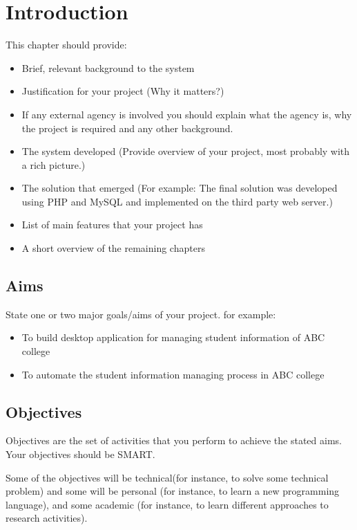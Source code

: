 \chapter{Introduction} %
\label{cha:introduction}

This chapter should provide:
\begin{itemize}
  \item Brief, relevant background to the system

  \item Justification for your project (Why it matters?)

  \item If any external agency is involved you should explain what the agency is, why the project is required and any other background.

  \item The system developed (Provide overview of your project, most probably with a rich picture.)
  \item The solution that emerged (For example: The final solution was developed using PHP and MySQL and implemented on the third party web server.)
  \item List of main features that your project has
  \item A short overview of the remaining chapters
\end{itemize}

\section{Aims} %
\label{sec:aims}
State one or two major goals/aims of your project.
for example:\\
\begin{itemize}
  \item To build desktop application for managing student information of ABC college
  \item To automate the student information managing process in ABC college
\end{itemize}

\section{Objectives} %
\label{sec:objectives}

Objectives are the set of activities that you perform to achieve the stated aims. Your objectives should be SMART.

Some of the objectives will be technical(for instance, to solve some technical problem) and some will be personal (for instance, to learn a new programming language), and some academic (for instance, to learn different approaches to research activities).

